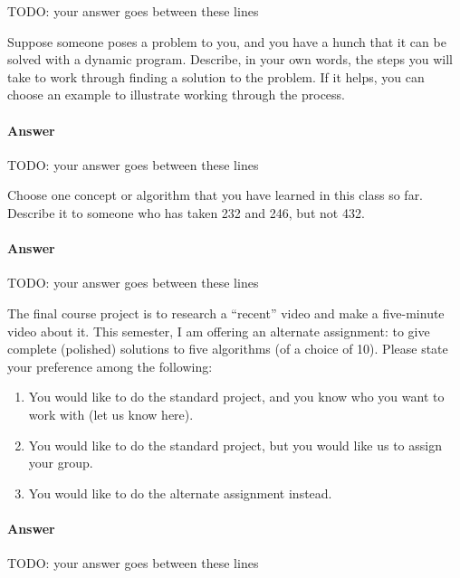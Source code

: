 \documentclass{article}
\begin{document}
TODO: your answer goes between these lines


\nextprob
{}

Suppose someone poses a problem to you, and you have a hunch that it can be
solved with a dynamic program.  Describe, in your own words, the steps you will
take to work through finding a solution to the problem.  If it helps, you can
choose an example to illustrate working through the process.

\paragraph{Answer}


TODO: your answer goes between these lines




\nextprob
{}

Choose one concept or algorithm that you have learned
in this class so far. Describe it to someone who has
taken 232 and 246, but not 432.

\paragraph{Answer}


TODO: your answer goes between these lines


\nextprob
{}

The final course project is to research a ``recent'' video and make a
five-minute video about it.  This semester, I am offering an alternate
assignment: to give complete (polished) solutions to five algorithms (of a
choice of 10).
Please state your preference among the following:

\begin{enumerate}
    \item You would like to do the standard project, and you know who you want
        to work with (let us know here).
    \item You would like to do the standard project, but you would like us to
        assign your group.
    \item You would like to do the alternate assignment instead.
\end{enumerate}

\paragraph{Answer}


TODO: your answer goes between these lines

\end{document}
